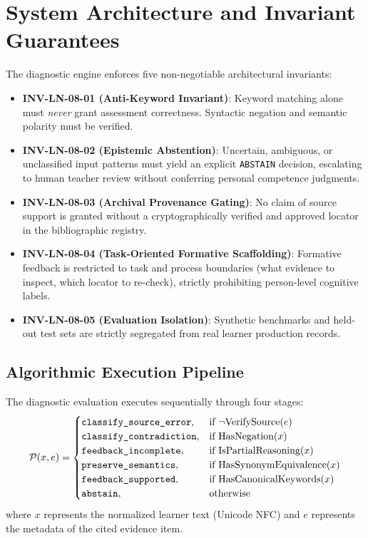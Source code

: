 \documentclass[11pt,a4paper]{article}
\begin{document}
\section{System Architecture and Invariant Guarantees}
The diagnostic engine enforces five non-negotiable architectural invariants:
\begin{itemize}[leftmargin=*]
    \item \textbf{INV-LN-08-01 (Anti-Keyword Invariant)}: Keyword matching alone must \textit{never} grant assessment correctness. Syntactic negation and semantic polarity must be verified.
    \item \textbf{INV-LN-08-02 (Epistemic Abstention)}: Uncertain, ambiguous, or unclassified input patterns must yield an explicit \texttt{ABSTAIN} decision, escalating to human teacher review without conferring personal competence judgments.
    \item \textbf{INV-LN-08-03 (Archival Provenance Gating)}: No claim of source support is granted without a cryptographically verified and approved locator in the bibliographic registry.
    \item \textbf{INV-LN-08-04 (Task-Oriented Formative Scaffolding)}: Formative feedback is restricted to task and process boundaries (what evidence to inspect, which locator to re-check), strictly prohibiting person-level cognitive labels.
    \item \textbf{INV-LN-08-05 (Evaluation Isolation)}: Synthetic benchmarks and held-out test sets are strictly segregated from real learner production records.
\end{itemize}

\subsection{Algorithmic Execution Pipeline}
The diagnostic evaluation executes sequentially through four stages:
\begin{equation}
\mathcal{P}(x, e) = 
\begin{cases}
\text{\texttt{classify\_source\_error}}, & \text{if } \neg \text{VerifySource}(e) \\
\text{\texttt{classify\_contradiction}}, & \text{if } \text{HasNegation}(x) \\
\text{\texttt{feedback\_incomplete}}, & \text{if } \text{IsPartialReasoning}(x) \\
\text{\texttt{preserve\_semantics}}, & \text{if } \text{HasSynonymEquivalence}(x) \\
\text{\texttt{feedback\_supported}}, & \text{if } \text{HasCanonicalKeywords}(x) \\
\text{\texttt{abstain}}, & \text{otherwise}
\end{cases}
\end{equation}
where $x$ represents the normalized learner text (Unicode NFC) and $e$ represents the metadata of the cited evidence item.
\end{document}
